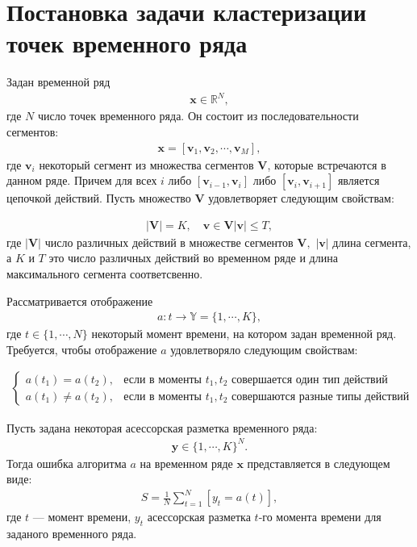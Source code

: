 \section{Постановка задачи кластеризации точек временного ряда}

Задан временной ряд
\[
\label{eq:st:1}
\begin{aligned}
\textbf{x} \in \mathbb{R}^{N},
\end{aligned}
\]
где $N$ число точек временного ряда. Он состоит из последовательности сегментов:
\[
\label{eq:st:2}
\begin{aligned}
\textbf{x} = [\textbf{v}_1, \textbf{v}_2, \cdots, \textbf{v}_M],
\end{aligned}
\]
где $\textbf{v}_i$ некоторый сегмент из множества сегментов $\mathbf{V}$, которые встречаются в данном ряде. 
Причем для всех $i$ либо $[\textbf{v}_{i-1},\textbf{v}_{i}]$ либо $[\textbf{v}_{i},\textbf{v}_{i+1}]$  является цепочкой действий. Пусть множество $\mathbf{V}$ удовлетворяет следующим свойствам:

\[
\label{eq:st:3}
\begin{aligned}
\left|\mathbf{V}\right| = K, \quad \textbf{v} \in \mathbf{V} \left|\textbf{v}\right| \leq T,
\end{aligned}
\]
где $\left|\mathbf{V}\right|$ число различных действий в множестве сегментов $\mathbf{V},$ $\left|\textbf{v}\right|$ длина сегмента, а $K$ и $T$ это число различных действий во временном ряде и длина максимального сегмента соответсвенно.

Рассматривается отображение
\[
\label{eq:st:4}
\begin{aligned}
a : t \to \mathbb{Y} = \{1,\cdots, K\}, 
\end{aligned}
\]
где $t \in \{1,\cdots, N\}$ некоторый момент времени, на котором задан временной ряд.
Требуется, чтобы отображение $a$ удовлетворяло следующим свойствам:

\[
\label{eq:st:5}
\begin{aligned}
\begin{cases}
    a\left(t_1\right) = a\left(t_2\right), &  \text{если в моменты } t_1, t_2 \text{ совершается один тип действий}\\
    a\left(t_1\right) \not= a\left(t_2\right), &  \text{если в моменты } t_1, t_2 \text{ совершаются разные типы действий }
\end{cases}
\end{aligned}
\]

Пусть задана некоторая асессорская разметка временного ряда:
\[
\label{eq:st:6}
\begin{aligned}
\textbf{y} \in \{1,\cdots,K\}^{N}.
\end{aligned}
\]
Тогда ошибка алгоритма $a$ на временном ряде $\textbf{x}$ представляется в следующем виде:
\[
\label{eq:st:7}
\begin{aligned}
S = \frac{1}{N}\sum_{t=1}^{N}[y_t = a\left(t\right)],
\end{aligned}
\]
где $t$ --- момент времени, $y_t$ асессорская разметка $t$-го момента времени для заданого временного ряда.


